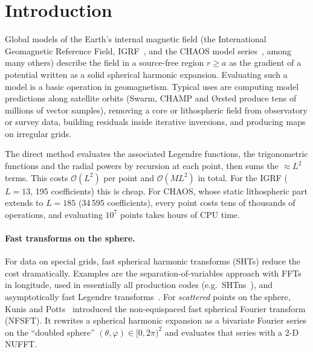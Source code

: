 \documentclass[11pt,a4paper]{article}
\theoremstyle{remark}
\newcommand{\Oh}{\mathcal{O}}
\begin{document}
\tableofcontents

\section{Introduction}

Global models of the Earth's internal magnetic field (the International Geomagnetic Reference
Field, IGRF~\cite{alken2021}, and the CHAOS model series~\cite{finlay2020}, among many others)
describe the field in a source-free region $r\ge a$ as the gradient of a potential written as a
solid spherical harmonic expansion. Evaluating such a model is a basic operation in
geomagnetism. Typical uses are computing model predictions along satellite orbits (Swarm, CHAMP and
\O rsted produce tens of millions of vector samples), removing a core or lithospheric field from
observatory or survey data, building residuals inside iterative inversions, and producing maps
on irregular grids.

The direct method evaluates the associated Legendre functions, the trigonometric
functions and the radial powers by recursion at each point, then sums the
$\approx L^2$ terms. This costs $\Oh(L^2)$ per point and $\Oh(ML^2)$ in total. For the IGRF ($L=13$, 195
coefficients) this is cheap. For CHAOS, whose static lithospheric part extends to $L=185$
(34\,595 coefficients), every point costs tens of thousands of operations, and evaluating
$10^7$ points takes hours of CPU time.

\paragraph{Fast transforms on the sphere.}
For data on special grids, fast spherical harmonic transforms (SHTs) reduce the cost
dramatically. Examples are the separation-of-variables approach with FFTs in longitude, used
in essentially all production codes (e.g.\ SHTns~\cite{schaeffer2013}), and asymptotically fast
Legendre transforms~\cite{driscoll1994}. For \emph{scattered} points on the sphere, Kunis and
Potts~\cite{kunis2003,keiner2009} introduced the non-equispaced fast spherical Fourier transform
(NFSFT). It rewrites a spherical harmonic expansion as a bivariate Fourier series on the
``doubled sphere'' $(\theta,\varphi)\in[0,2\pi)^2$ and evaluates that series with a 2-D NUFFT.
\end{document}
